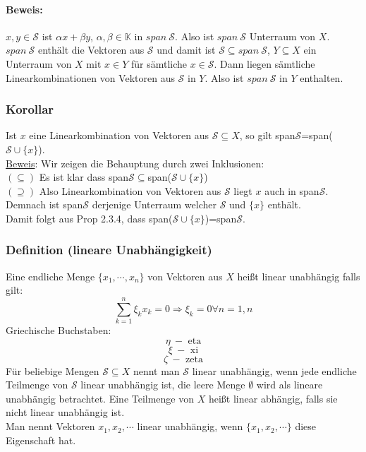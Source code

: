 \paragraph{Beweis:} $x,y\in \mathcal{S}$ ist $\alpha x+\beta y$, $\alpha,\beta\in\mathbb{K}$ in $span\ \mathcal{S}$. Also ist $span\ \mathcal{S}$ Unterraum von $X$. $span\ \mathcal{S}$ enthält die Vektoren aus $\mathcal{S}$ und damit ist $\mathcal{S}\subseteq span\ \mathcal{S}$, $Y\subseteq X$ ein Unterraum von $X$ mit $x\in Y$ für sämtliche $x\in\mathcal{S}$. Dann liegen sämtliche Linearkombinationen von Vektoren aus $\mathcal{S}$ in $Y$. Also ist $span\ \mathcal{S}$ in $Y$ enthalten.
\subsubsection{Korollar}
Ist $x$ eine Linearkombination von Vektoren aus $\mathcal{S}\subseteq X$, so gilt span$\mathcal{S}$=span($\mathcal{S}\cup \{x\}$).\\
\underline{Beweis}: Wir zeigen die Behauptung durch zwei Inklusionen:\\
$(\subseteq )$ Es ist klar dass span$\mathcal{S}\subseteq$span($\mathcal{S}\cup\{x\}$)\\
$(\supseteq )$ Also Linearkombination von Vektoren aus $\mathcal{S}$ liegt $x$ auch in span$\mathcal{S}$.\\
Demnach ist span$\mathcal{S}$ derjenige Unterraum welcher $\mathcal{S}$ und $\{x\}$ enthält.\\
Damit folgt aus Prop 2.3.4, dass span($\mathcal{S}\cup\{x\}$)=span$\mathcal{S}$.
\subsubsection{Definition (lineare Unabhängigkeit)}
Eine endliche Menge $\{x_1,\cdots ,x_n\}$ von Vektoren aus $X$ heißt linear unabhängig falls gilt:
\[\sum^n_{k=1} \xi _k x_k = 0 \Rightarrow \xi _k =0 \forall n=1,n\]
Griechische Buchstaben:
\[\eta \ - \text{ eta}\]
\[\xi \ - \text{ xi}\]
\[\zeta \ - \text{ zeta} \]
Für beliebige Mengen $\mathcal{S}\subseteq X$ nennt man $\mathcal{S}$ linear unabhängig, wenn jede endliche Teilmenge von $\mathcal{S}$ linear unabhängig ist, die leere Menge $\emptyset$ wird als lineare unabhängig betrachtet.  Eine Teilmenge von $X$ heißt linear abhängig, falls sie nicht linear unabhängig ist.\\
Man nennt Vektoren $x_1 ,x_2 ,\cdots $ linear unabhängig, wenn $\{x_1,x_2,\cdots \}$ diese Eigenschaft hat.
